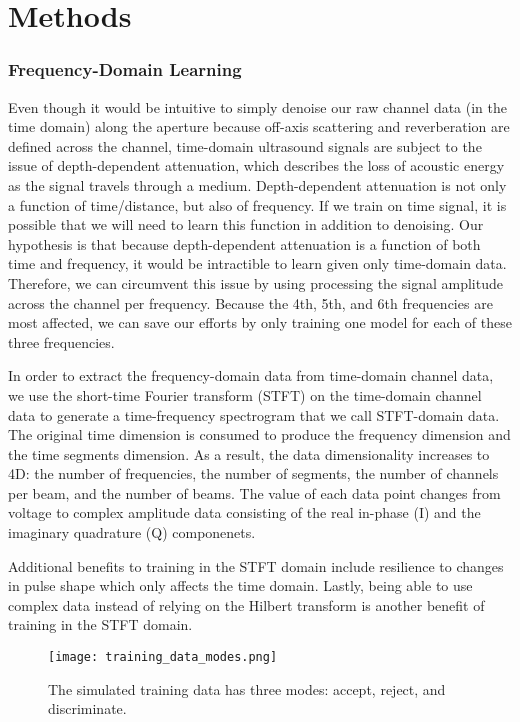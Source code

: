 \chapter{Methods}

\subsection{Frequency-Domain Learning}

Even though it would be intuitive to simply denoise our raw channel data (in the time domain) along the aperture because off-axis scattering and reverberation are defined across the channel, time-domain ultrasound signals are subject to the issue of depth-dependent attenuation, which describes the loss of acoustic energy as the signal travels through a medium. Depth-dependent attenuation is not only a function of time/distance, but also of frequency. If we train on time signal, it is possible that we will need to learn this function in addition to denoising. Our hypothesis is that because depth-dependent attenuation is a function of both time and frequency, it would be intractible to learn given only time-domain data. Therefore, we can circumvent this issue by using processing the signal amplitude across the channel per frequency. Because the 4th, 5th, and 6th frequencies are most affected, we can save our efforts by only training one model for each of these three frequencies.

In order to extract the frequency-domain data from time-domain channel data, we use the short-time Fourier transform (STFT) on the time-domain channel data to generate a time-frequency spectrogram that we call STFT-domain data. The original time dimension is consumed to produce the frequency dimension and the time segments dimension. As a result, the data dimensionality increases to 4D: the number of frequencies, the number of segments, the number of channels per beam, and the number of beams. The value of each data point changes from voltage to complex amplitude data consisting of the real in-phase (I) and the imaginary quadrature (Q) componenets.

Additional benefits to training in the STFT domain include resilience to changes in pulse shape which only affects the time domain. Lastly, being able to use complex data instead of relying on the Hilbert transform is another benefit of training in the STFT domain.


\begin{figure}
  \centerline{\texttt{[image: training\_data\_modes.png]}}
  \caption{The simulated training data has three modes: accept, reject, and discriminate.}
  \label{fig:training_data_modes}
\end{figure}

